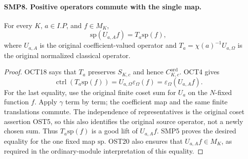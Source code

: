 \documentclass[11pt,a4paper]{article}
\numberwithin{equation}{section}
\theoremstyle{remark}\newtheorem{remark}[theorem]{Remark}
\begin{document}
\paragraph{SMP8. Positive operators commute with the single map.}
\label{claim:SMP8}
For every $K$, $a\in I.P$, and $f\in M_K$,
\[
       \mathrm{sp}(U_{a,\allowbreak{} A}f)=T_a\mathrm{sp}(f),
\]
where $U_{a,\allowbreak{} A}$ is the original coefficient-valued
operator and $T_a=\chi(a)^{-1}U_{a,\Omega}$ is the
original normalized classical operator.
\begin{proof}
OCT18 says that $T_a$ preserves $S_{K,\allowbreak{} c}$ and hence
$C^{\mathrm{ord}}_{K,\allowbreak{} c}$.  OCT4 gives
\[
 \operatorname{ctrl}(T_a\mathrm{sp}(f))
     =U_{a,\Omega}\varepsilon_\Omega(f)
     =\varepsilon_\Omega(U_{a,\allowbreak{} A}f).
\]
For the last equality, use the original finite coset
sum for $U_a$ on the $N$-fixed function $f$.  Apply
$\gamma$ term by term; the coefficient map and the
same finite translations commute.  The independence
of representatives is the original coset assertion
OST5, so this also identifies the original source
operator, not a newly chosen sum.  Thus
$T_a\mathrm{sp}(f)$ is a good lift of $U_{a,\allowbreak{} A}f$.
SMP5 proves the desired equality for the one fixed
map $\mathrm{sp}$.  OST20 also ensures that
$U_{a,\allowbreak{} A}f\in M_K$, as required in the ordinary-module
interpretation of this equality.
\end{proof}

\end{document}
